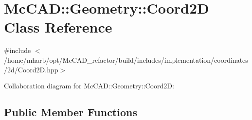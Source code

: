 \hypertarget{classMcCAD_1_1Geometry_1_1Coord2D}{}\section{Mc\+C\+AD\+:\+:Geometry\+:\+:Coord2D Class Reference}
\label{classMcCAD_1_1Geometry_1_1Coord2D}


{\ttfamily \#include $<$/home/mharb/opt/\+Mc\+C\+A\+D\+\_\+refactor/build/includes/implementation/coordinates/2d/\+Coord2\+D.\+hpp$>$}



Collaboration diagram for Mc\+C\+AD\+:\+:Geometry\+:\+:Coord2D\+:
\subsection*{Public Member Functions}
